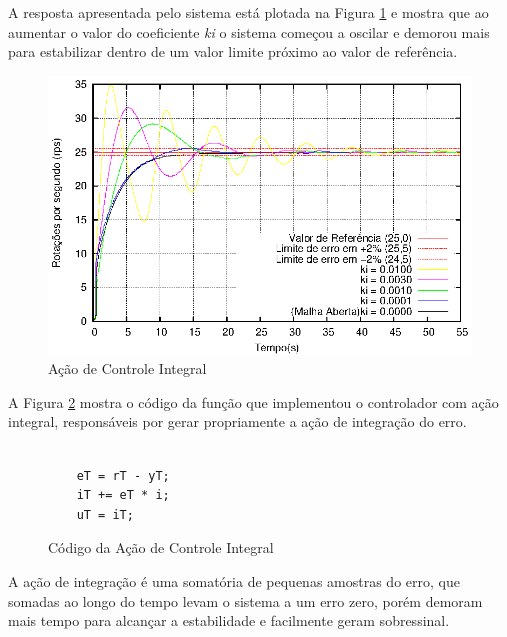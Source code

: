 A resposta apresentada pelo sistema está plotada na Figura \ref{fig:acaoI} e mostra que ao aumentar o valor do coeficiente \emph{ki} o sistema começou a oscilar e demorou mais para estabilizar dentro de um valor limite próximo ao valor de referência. 

\begin{figure}[!h]
\center\includegraphics[scale=1.3]{./imagens/acaoI.eps}
\caption{Ação de Controle Integral}
\label{fig:acaoI}
\end{figure}

A Figura \ref{fig:codigoControladorI} mostra o código da função que implementou o controlador com ação integral, responsáveis por gerar propriamente a ação de integração do erro.


\begin{figure}[!htb]
\centering
\begin{minipage}{0.8\linewidth}
\lstset{firstnumber=13}
\begin{lstlisting}

    eT = rT - yT;
    iT += eT * i; 
    uT = iT;
\end{lstlisting}
\end{minipage}
\caption{Código da Ação de Controle Integral}
\label{fig:codigoControladorI}
\end{figure}

A ação de integração é uma somatória de pequenas amostras do erro, que somadas ao longo do tempo levam o sistema a um erro zero, porém demoram mais tempo para alcançar a estabilidade e facilmente geram sobressinal.










